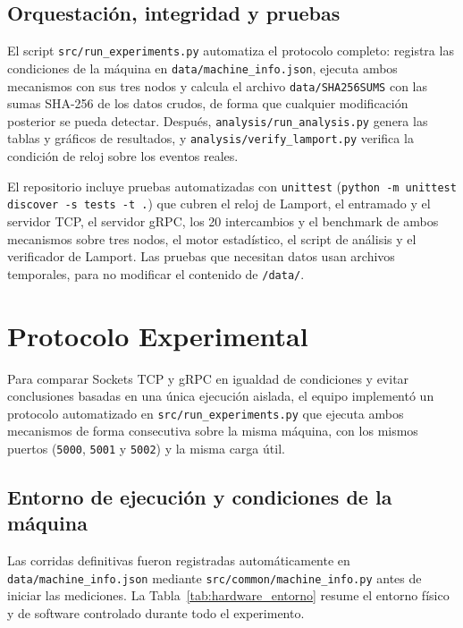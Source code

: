 \documentclass[12pt,a4paper]{article}
\begin{document}
\subsection{Orquestación, integridad y pruebas}

El script \texttt{src/run\_experiments.py} automatiza el protocolo completo: registra las condiciones de la máquina en \texttt{data/machine\_info.json}, ejecuta ambos mecanismos con sus tres nodos y calcula el archivo \texttt{data/SHA256SUMS} con las sumas SHA-256 de los datos crudos, de forma que cualquier modificación posterior se pueda detectar. Después, \texttt{analysis/run\_analysis.py} genera las tablas y gráficos de resultados, y \texttt{analysis/verify\_lamport.py} verifica la condición de reloj sobre los eventos reales.

El repositorio incluye pruebas automatizadas con \texttt{unittest} (\texttt{python -m unittest discover -s tests -t .}) que cubren el reloj de Lamport, el entramado y el servidor TCP, el servidor gRPC, los 20 intercambios y el benchmark de ambos mecanismos sobre tres nodos, el motor estadístico, el script de análisis y el verificador de Lamport. Las pruebas que necesitan datos usan archivos temporales, para no modificar el contenido de \texttt{/data/}.

\section{Protocolo Experimental}
\label{sec:protocolo_experimental}

Para comparar Sockets TCP y gRPC en igualdad de condiciones y evitar conclusiones basadas en una única ejecución aislada, el equipo implementó un protocolo automatizado en \texttt{src/run\_experiments.py} que ejecuta ambos mecanismos de forma consecutiva sobre la misma máquina, con los mismos puertos (\texttt{5000}, \texttt{5001} y \texttt{5002}) y la misma carga útil.

\subsection{Entorno de ejecución y condiciones de la máquina}

Las corridas definitivas fueron registradas automáticamente en \texttt{data/machine\_info.json} mediante \texttt{src/common/machine\_info.py} antes de iniciar las mediciones. La Tabla~\ref{tab:hardware_entorno} resume el entorno físico y de software controlado durante todo el experimento.
\end{document}
